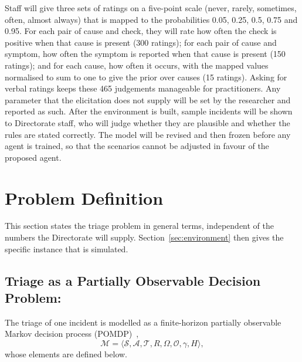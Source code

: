 Staff will give three sets of ratings on a five-point scale (never, rarely, sometimes, often, almost always) that is mapped to the probabilities 0.05, 0.25, 0.5, 0.75 and 0.95. For each pair of cause and check, they will rate how often the check is positive when that cause is present (300 ratings); for each pair of cause and symptom, how often the symptom is reported when that cause is present (150 ratings); and for each cause, how often it occurs, with the mapped values normalised to sum to one to give the prior over causes (15 ratings). Asking for verbal ratings keeps these 465 judgements manageable for practitioners. Any parameter that the elicitation does not supply will be set by the researcher and reported as such. After the environment is built, sample incidents will be shown to Directorate staff, who will judge whether they are plausible and whether the rules are stated correctly. The model will be revised and then frozen before any agent is trained, so that the scenarios cannot be adjusted in favour of the proposed agent.

\section{Problem Definition}
\label{sec:problem}

This section states the triage problem in general terms, independent of the numbers the Directorate will supply. Section~\ref{sec:environment} then gives the specific instance that is simulated.

\subsection{Triage as a Partially Observable Decision Problem:}

The triage of one incident is modelled as a finite-horizon partially observable Markov decision process (POMDP)~\cite{kaelbling1998},
\begin{equation}
\mathcal{M} = \langle \mathcal{S}, \mathcal{A}, \mathcal{T}, R, \Omega, \mathcal{O}, \gamma, H \rangle,
\end{equation}
whose elements are defined below.

